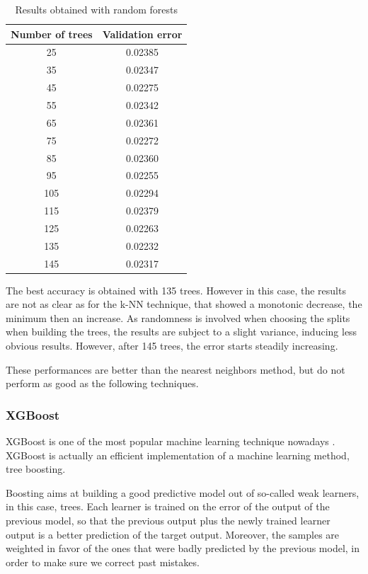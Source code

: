 \begin{table}[h]
    \centering
    \begin{tabular}{|c|c|}
        \hline
        Number of trees & Validation error \\ \hline
        25  & 0.02385 \\
        35  & 0.02347 \\
        45  & 0.02275 \\
        55  & 0.02342 \\
        65  & 0.02361 \\
        75  & 0.02272 \\
        85  & 0.02360 \\
        95  & 0.02255 \\
        105 & 0.02294 \\
        115 & 0.02379 \\
        125 & 0.02263 \\
        135 & 0.02232 \\
        145 & 0.02317 \\ \hline
    \end{tabular}
    \caption{Results obtained with random forests}
    \label{tab:trees-results}
\end{table}

The best accuracy is obtained with 135 trees. However in this case, the results are not as clear as for the k-NN technique, that showed a monotonic decrease, the minimum then an increase. As randomness is involved when choosing the splits when building the trees, the results are subject to a slight variance, inducing less obvious results. However, after 145 trees, the error starts steadily increasing.

These performances are better than the nearest neighbors method, but do not perform as good as the following techniques.

\subsubsection{XGBoost}

XGBoost is one of the most popular machine learning technique nowadays \cite{XGBoost}. XGBoost is actually an efficient implementation of a machine learning method, tree boosting.

Boosting aims at building a good predictive model out of so-called weak learners, in this case, trees. Each learner is trained on the error of the output of the previous model, so that the previous output plus the newly trained learner output is a better prediction of the target output. Moreover, the samples are weighted in favor of the ones that were badly predicted by the previous model, in order to make sure we correct past mistakes.

